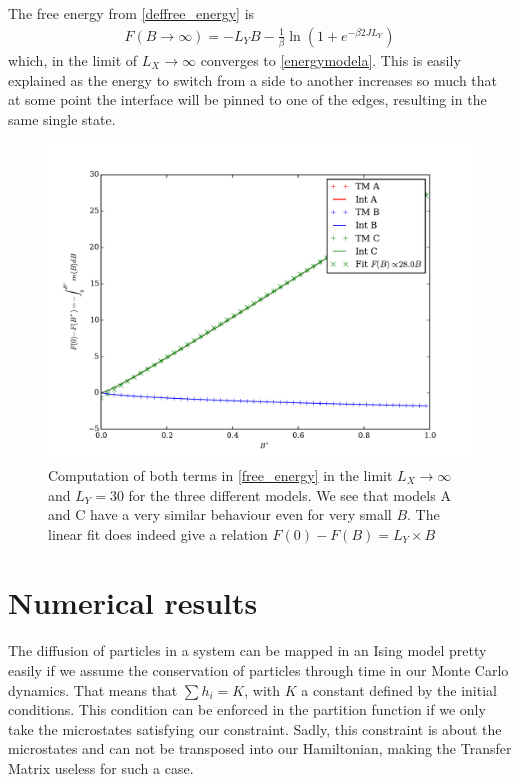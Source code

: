 The free energy from \ref{deffree_energy} is 
\begin{align}
  F(B\rightarrow \infty) = - L_Y B - \frac{1}{\beta} \ln \left( 1 + e^{-\beta 2 J L_Y} \right)
  \label{energymodelc}
\end{align}
which, in the limit of $L_X \rightarrow \infty$ converges to \ref{energymodela}. This is easily explained as the energy to switch from a side to another increases so much that at some point the interface will be pinned to one of the edges, resulting in the same single state.

\begin{figure}
  \includegraphics[width=13cm]{tm/comparison.pdf}
  \caption{Computation of both terms in \ref{free_energy} in the limit $L_X \rightarrow \infty$ and $L_Y=30$ for the three different models. We see that models A and C have a very similar behaviour even for very small $B$. The linear fit does indeed give a relation $F(0) - F(B) = L_Y \times B$}
\end{figure}

\newpage
\section{Numerical results}

The diffusion of particles in a system can be mapped in an Ising model pretty easily if we assume the conservation of particles through time in our Monte Carlo dynamics. That means that $\sum h_i = K$, with $K$ a constant defined by the initial conditions. This condition can be enforced in the partition function if we only take the microstates satisfying our constraint. Sadly, this constraint is about the microstates and can not be transposed into our Hamiltonian, making the Transfer Matrix useless for such a case. 

